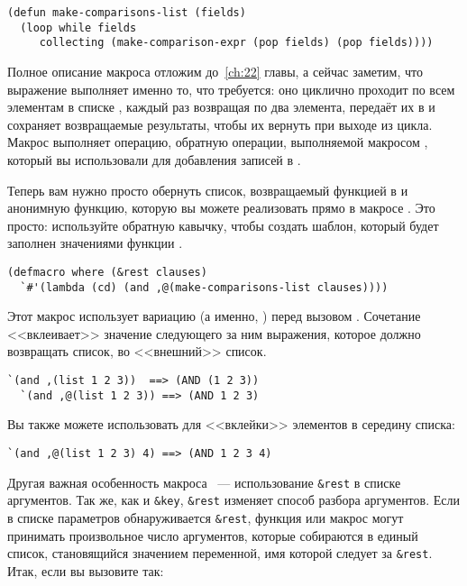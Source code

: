 \begin{lstlisting}
(defun make-comparisons-list (fields)
  (loop while fields
     collecting (make-comparison-expr (pop fields) (pop fields))))
\end{lstlisting}

Полное описание макроса  отложим до~\ref{ch:22} главы, а сейчас заметим, что выражение
 выполняет именно то, что требуется: оно циклично проходит по всем элементам в
списке , каждый раз возвращая по два элемента, передаёт их в
 и сохраняет возвращаемые результаты, чтобы их вернуть при
выходе из цикла. Макрос  выполняет операцию, обратную операции, выполняемой макросом
, который вы использовали для добавления записей в .

Теперь вам нужно просто обернуть список, возвращаемый функцией 
в  и анонимную функцию, которую вы можете реализовать прямо в макросе
. Это просто: используйте обратную кавычку, чтобы создать шаблон, который
будет заполнен значениями функции .

\begin{lstlisting}
(defmacro where (&rest clauses)
  `#'(lambda (cd) (and ,@(make-comparisons-list clauses))))
\end{lstlisting}

Этот макрос использует вариацию \code{,} (а именно, ) перед вызовом
. Сочетание  <<вклеивает>> значение следующего за ним
выражения, которое должно возвращать список, во <<внешний>> список.

\begin{lstlisting}[style=lisprepl]
  `(and ,(list 1 2 3))  ==> (AND (1 2 3))
  `(and ,@(list 1 2 3)) ==> (AND 1 2 3)
\end{lstlisting}

Вы также можете использовать  для <<вклейки>> элементов в середину списка:

\begin{lstlisting}[style=lisprepl]
  `(and ,@(list 1 2 3) 4) ==> (AND 1 2 3 4)
\end{lstlisting}

Другая важная особенность макроса ~--- использование \lstinline{&rest} в списке
аргументов. Так же, как и \lstinline!&key!, \lstinline{&rest} изменяет способ разбора
аргументов. Если в списке параметров обнаруживается \lstinline{&rest}, функция или макрос могут
принимать произвольное число аргументов, которые собираются в единый список, становящийся
значением переменной, имя которой следует за \lstinline{&rest}. Итак, если вы вызовите
 так:


